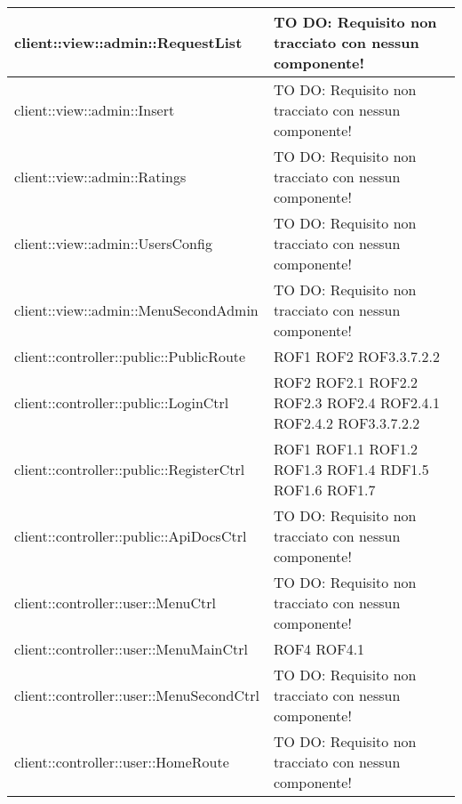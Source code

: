 \begin{center}
\begin{longtable}{| p{11cm} | p{2.5cm} |}
\hline
client::view::admin::RequestList & TO DO: Requisito non tracciato con nessun componente! \\
\hline
client::view::admin::Insert & TO DO: Requisito non tracciato con nessun componente! \\
\hline
client::view::admin::Ratings & TO DO: Requisito non tracciato con nessun componente! \\
\hline
client::view::admin::UsersConfig & TO DO: Requisito non tracciato con nessun componente! \\
\hline
client::view::admin::MenuSecondAdmin & TO DO: Requisito non tracciato con nessun componente! \\
\hline
client::controller::public::PublicRoute & ROF1 \newline ROF2 \newline ROF3.3.7.2.2 \\
\hline
client::controller::public::LoginCtrl & ROF2 \newline ROF2.1 \newline ROF2.2 \newline ROF2.3 \newline ROF2.4 \newline ROF2.4.1 \newline ROF2.4.2 \newline ROF3.3.7.2.2 \\
\hline
client::controller::public::RegisterCtrl & ROF1 \newline ROF1.1 \newline ROF1.2 \newline ROF1.3 \newline ROF1.4 \newline RDF1.5 \newline ROF1.6 \newline ROF1.7 \\
\hline
client::controller::public::ApiDocsCtrl & TO DO: Requisito non tracciato con nessun componente! \\
\hline
client::controller::user::MenuCtrl & TO DO: Requisito non tracciato con nessun componente! \\
\hline
client::controller::user::MenuMainCtrl & ROF4 \newline ROF4.1 \\
\hline
client::controller::user::MenuSecondCtrl & TO DO: Requisito non tracciato con nessun componente! \\
\hline
client::controller::user::HomeRoute & TO DO: Requisito non tracciato con nessun componente! \\

\end{longtable}
\end{center}
